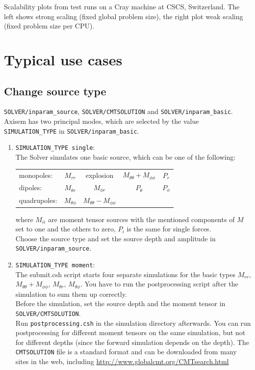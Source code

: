 \documentclass{article}
\begin{document}
Scalability plots from test runs on a Cray machine at CSCS, Switzerland. The left shows
strong scaling (fixed global problem size), the right plot weak scaling (fixed problem
size per CPU).


\section{Typical use cases}

\subsection{Change source type}

\verb|SOLVER/inparam_source|, \verb|SOLVER/CMTSOLUTION| and \verb|SOLVER/inparam_basic|.
Axisem has two principal modes, which are selected by the value \verb|SIMULATION_TYPE| in
\verb|SOLVER/inparam_basic|.

\begin{enumerate}
\item \verb|SIMULATION_TYPE single|:\\ The Solver simulates one basic source, which can be
      one of the following:\\
      \begin{center}
        \begin{tabular}{|l|cccc|} \hline
         monopoles:   & $M_{rr}$ & explosion  & $M_{\theta\theta}+M_{\phi\phi}$  & $P_r$ \\
         dipoles:     & $M_{\theta r}$ & $M_{\phi r}$        & $P_{\theta}$ & $P_{\phi}$\\
         quadrupoles: & $M_{\theta \phi}$ & $M_{\theta\theta}-M_{\phi\phi}$ & & \\\hline
        \end{tabular}
      \end{center}
      where $M_{ii}$ are moment tensor sources with the mentioned components of $M$ set to
      one and the others to zero, $P_i$ is the same for single forces.\\ Choose the source
      type and set the source depth and amplitude in \verb|SOLVER/inparam_source|.

\item \verb|SIMULATION_TYPE moment|:\\
      The submit.csh script starts four separate simulations for the basic types $M_{rr}$,
      $M_{\theta\theta}+M_{\phi\phi}$, $M_{\theta r}$, $M_{\theta \phi}$. You have to run
      the postprocessing script after the simulation to sum them up correctly. \\ Before
      the simulation, set the source depth and the moment tensor in
      \verb|SOLVER/CMTSOLUTION|. \\Run \verb|postprocessing.csh| in the simulation
      directory afterwards. You can run postprocessing for different moment tensors on the
      same simulation, but not for different depths (since the forward simulation depends
      on the depth).  The \verb|CMTSOLUTION| file is a standard format and can be
      downloaded from many sites in the web, including
      \url{http://www.globalcmt.org/CMTsearch.html}
\end{enumerate}
\end{document}
